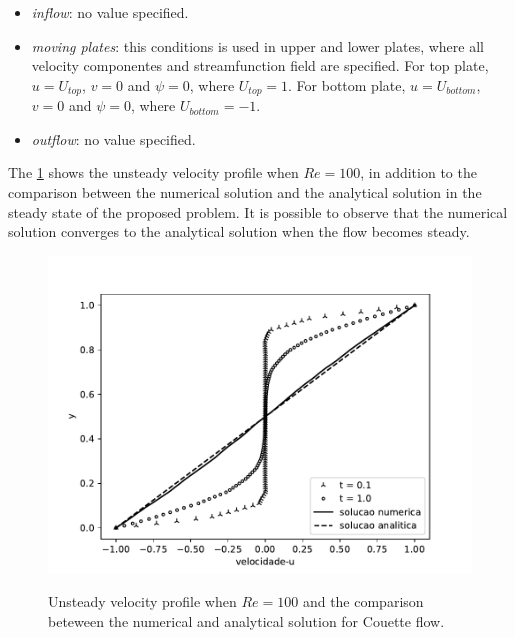 \begin{itemize}
     \item \textit{inflow}: no value specified. 

     \item \textit{moving plates}: this conditions is used in upper and lower plates, 
      where all velocity componentes and streamfunction field are specified.
      For top plate, 
      $u=U_{top}$, $v=0$ and $\psi=0$, where $U_{top} = 1$.
      For bottom plate, $u=U_{bottom}$, $v=0$ and $\psi=0$, where $U_{bottom} = -1$.

     \item \textit{outflow}: no value specified. 
\end{itemize}


\newpage
The \ref{velocidade couette} shows the unsteady velocity profile
when $Re=100$, in addition to the comparison between 
the numerical solution and the analytical solution 
in the steady state of the proposed problem. 
It is possible to observe that the numerical solution 
converges to the analytical solution when the flow becomes steady.

\begin{figure}[H]
     \centering
     \includegraphics[scale=1]{./02_chaps/cap_validation/figure/couette_velocity.pdf}\\
     \medskip
     \caption{Unsteady velocity profile when $Re=100$ and
     the comparison beteween the numerical and analytical solution 
     for Couette flow.}
     \label{velocidade couette}
\end{figure}

\newpage
